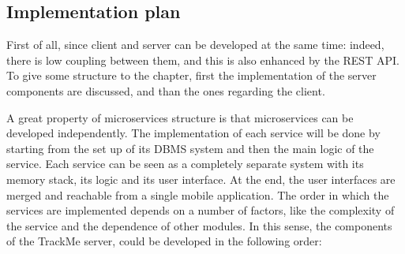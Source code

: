\subsection{Implementation plan}
First of all, since client and server can be developed at the same time: indeed, there is low coupling
between them, and this is also enhanced by the REST API. To give some structure to the chapter, first the
implementation of the server components are discussed, and than the ones regarding the client. \\ 

\par 
A great property of microservices structure is that microservices can be developed independently. 
The implementation of each service will be done by starting from the set up of its DBMS system and then
the main logic of the service. 
Each service can be seen as a completely separate system with its memory stack, its logic and its user
interface. 
At the end, the user interfaces are merged and reachable from a single mobile application. 
The order in which the services are implemented depends on a number of factors, like the complexity of the
service and the dependence of other modules. 
In this sense, the components of the TrackMe server, could be developed in the following order:

